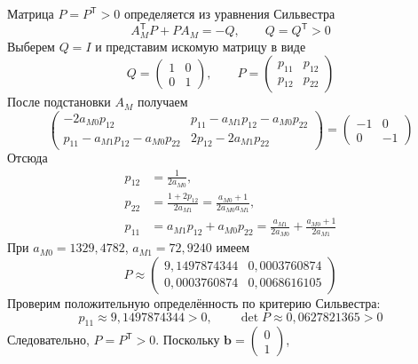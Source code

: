 Матрица $P=P^{\mathsf T}>0$ определяется из уравнения Сильвестра
\begin{equation}
  A_M^{\mathsf T}P+PA_M=-Q,
  \qquad Q=Q^{\mathsf T}>0
\end{equation}
Выберем $Q=I$ и представим искомую матрицу в виде
\begin{equation}
  Q=\begin{pmatrix}1&0\\0&1\end{pmatrix},
  \qquad P=\begin{pmatrix}p_{11}&p_{12}\\p_{12}&p_{22}\end{pmatrix}
\end{equation}
После подстановки $A_M$ получаем
\begin{equation}
  \begin{pmatrix}
    -2a_{M0}p_{12}&p_{11}-a_{M1}p_{12}-a_{M0}p_{22}\\
    p_{11}-a_{M1}p_{12}-a_{M0}p_{22}&2p_{12}-2a_{M1}p_{22}
  \end{pmatrix}
  =\begin{pmatrix}-1&0\\0&-1\end{pmatrix}
\end{equation}
Отсюда
\begin{equation}
  \begin{aligned}
    p_{12}&=\frac{1}{2a_{M0}},\\
    p_{22}&=\frac{1+2p_{12}}{2a_{M1}}
    =\frac{a_{M0}+1}{2a_{M0}a_{M1}},\\
    p_{11}&=a_{M1}p_{12}+a_{M0}p_{22}
    =\frac{a_{M1}}{2a_{M0}}+\frac{a_{M0}+1}{2a_{M1}}
  \end{aligned}
\end{equation}
При $a_{M0}=1329{,}4782$, $a_{M1}=72{,}9240$ имеем
\begin{equation}
  P\approx\begin{pmatrix}
    9{,}1497874344&0{,}0003760874\\
    0{,}0003760874&0{,}0068616105
  \end{pmatrix}
\end{equation}
Проверим положительную определённость по критерию Сильвестра:
\begin{equation}
  p_{11}\approx9{,}1497874344>0,
  \qquad \det P\approx0{,}0627821365>0
\end{equation}
Следовательно, $P=P^{\mathsf T}>0$. Поскольку $\bm b=
\begin{pmatrix}
  0\\ 1
\end{pmatrix}$,
